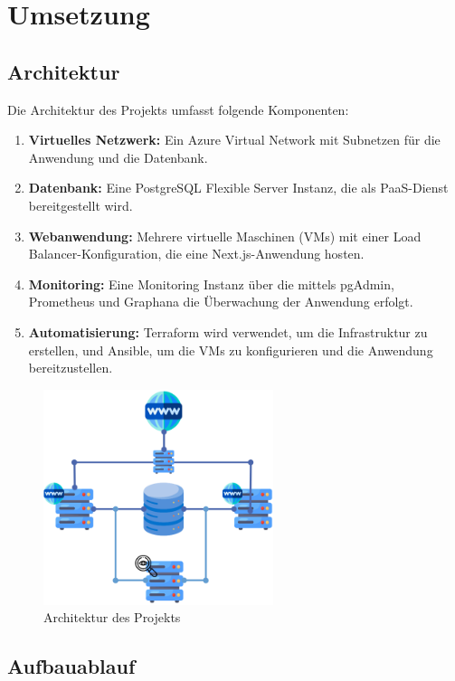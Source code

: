 
\chapter{Umsetzung}

\section{Architektur}
Die Architektur des Projekts umfasst folgende Komponenten:
\begin{enumerate}
    \item \textbf{Virtuelles Netzwerk:} Ein Azure Virtual Network mit Subnetzen für die Anwendung und die Datenbank.
    \item \textbf{Datenbank:} Eine PostgreSQL Flexible Server Instanz, die als PaaS-Dienst bereitgestellt wird.
    \item \textbf{Webanwendung:} Mehrere virtuelle Maschinen (VMs) mit einer Load Balancer-Konfiguration, die eine Next.js-Anwendung hosten.
    \item \textbf{Monitoring:} Eine Monitoring Instanz über die mittels pgAdmin, Prometheus und Graphana die Überwachung der Anwendung erfolgt.
    \item \textbf{Automatisierung:} Terraform wird verwendet, um die Infrastruktur zu erstellen, und Ansible, um die VMs zu konfigurieren und die Anwendung bereitzustellen.
\end{enumerate}

\begin{figure}[H]
    \centering
    \includegraphics[width=0.6\textwidth]{resources/images/Architektur.png}
    \caption{Architektur des Projekts}
\end{figure}

\section{Aufbauablauf}

